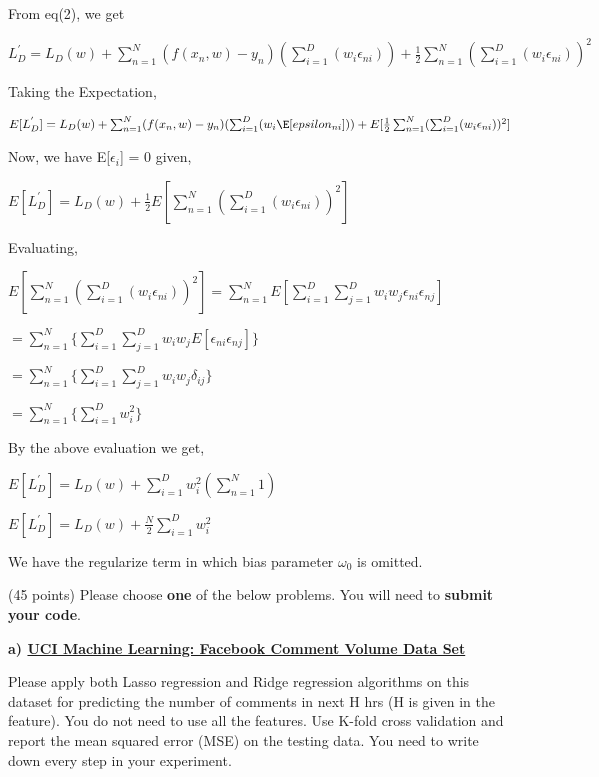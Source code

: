 \documentclass{exam}
\begin{document}
\begin{questions}
From eq(2), we get

$L_{D}^{'} = L_{D}(w) + \sum_{n=1}^{N}(f(x_{n},w) -y_{n})(\sum_{i=1}^{D}(w_{i}\epsilon_{ni})) +\frac{1}{2}\sum_{n=1}^{N} (\sum_{i=1}^{D}(w_{i}\epsilon_{ni}))^2$

Taking the Expectation,

$E[L_{D}^{'}] = L_{D}(w) + \sum_{n=1}^{N}(f(x_{n},w) -y_{n})(\sum_{i=1}^{D}(w_{i}\E[epsilon_{ni}])) +E[\frac{1}{2}\sum_{n=1}^{N} (\sum_{i=1}^{D}(w_{i}\epsilon_{ni}))^2]$

Now, we have E[$\epsilon_{i}$] = 0 given,

$E[L_{D}^{'}] = L_{D}(w) + \frac{1}{2}E[\sum_{n=1}^{N} (\sum_{i=1}^{D}(w_{i}\epsilon_{ni}))^2]$

Evaluating,

$E[\sum_{n=1}^{N} (\sum_{i=1}^{D}(w_{i}\epsilon_{ni}))^2] = \sum_{n=1}^{N} E[\sum_{i=1}^{D}\sum_{j=1}^{D} w_{i}w_{j}\epsilon_{ni}\epsilon_{nj}]$

$=\sum_{n=1}^{N}\{ \sum_{i=1}^{D}\sum_{j=1}^{D} w_{i}w_{j}E[\epsilon_{ni}\epsilon_{nj}]\}$

$=\sum_{n=1}^{N}\{ \sum_{i=1}^{D}\sum_{j=1}^{D} w_{i}w_{j}\delta_{ij}\}$

$=\sum_{n=1}^{N}\{ \sum_{i=1}^{D}w_{i}^2\}$

By the above evaluation we get,

$E[L_{D}^{'}] = L_{D}(w) +\sum_{i=1}^{D}w_{i}^2(\sum_{n=1}^{N}{1} )$ 

$E[L_{D}^{'}] = L_{D}(w)+\frac{N}{2}\sum_{i=1}^{D}w_{i}^2$

We have the regularize term in which bias parameter $\omega_{0}$ is omitted.







\newpage
{} (45 points) Please choose \textbf{one} of the below problems. You will need to \textbf{submit your code}.

{\bf a) \href{https://archive.ics.uci.edu/ml/datasets/Facebook+Comment+Volume+Dataset}{UCI Machine Learning: Facebook Comment Volume Data Set }}

Please apply both Lasso regression and Ridge regression algorithms on this dataset for predicting the number of comments in next H hrs (H is given in the feature).  You do not need to use all the features. Use K-fold cross validation and report the mean squared error (MSE) on the testing data. You need to write down every step in your experiment.


\end{questions}
\end{document}
